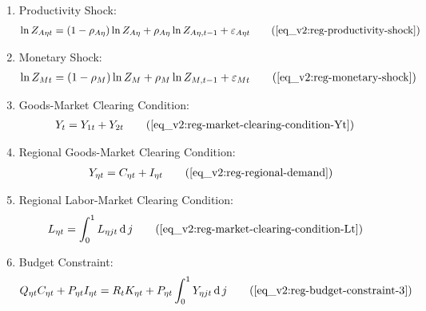 \documentclass[../thesis.tex]{subfiles}
\begin{document}
{\begin{itemize}
\begin{enumerate}
		\begin{comment}
		\item National Price Level:
		\begin{align}
			P_{t} &= \frac{P_{1t} Y_{1t} + P_{2t} Y_{2t}}{Y_{t}} \tag{\ref{eq_v2:reg-national-price-level}} %
		\end{align}			
		\end{comment}
				
		\item Productivity Shock:
		\begin{align}
			\ln{Z_{A\eta t}} = (1-\rho_{A\eta})\ln{Z_{A\eta}} + \rho_{A\eta}\ln{Z_{A\eta,t-1}} + \varepsilon_{A\eta t} \tag{\ref{eq_v2:reg-productivity-shock}}
		\end{align}
		
		\item Monetary Shock:
		\begin{align}
			\ln{Z_{Mt}} = (1-\rho_M)\ln{Z_{M}} + \rho_M\ln{Z_{M,t-1}} + \varepsilon_{Mt} \tag{\ref{eq_v2:reg-monetary-shock}}
		\end{align}

		\item Goods-Market Clearing Condition:
		\begin{align}
			Y_{t} &= Y_{1 t} + Y_{2 t} \tag{\ref{eq_v2:reg-market-clearing-condition-Yt}}
		\end{align}

		\item Regional Goods-Market Clearing Condition:
		\begin{align}
			Y_{\eta t} = C_{\eta t} + I_{\eta t} \tag{\ref{eq_v2:reg-regional-demand}}
		\end{align}
		
		\item Regional Labor-Market Clearing Condition:
		\begin{align}
			L_{\eta t} &= \int_{0}^{1} L_{\eta jt} \dif j \tag{\ref{eq_v2:reg-market-clearing-condition-Lt}}
		\end{align}

		\item Budget Constraint:
		\begin{align}
			Q_{\eta t} C_{\eta t} + P_{\eta t} I_{\eta t} = R_{t} K_{\eta t} + P_{\eta t} \int_{0}^{1} Y_{\eta jt} \dif j \tag{\ref{eq_v2:reg-budget-constraint-3}}
		\end{align}
						
		\end{enumerate}
		
	\end{itemize}
	
} %
\end{document}
